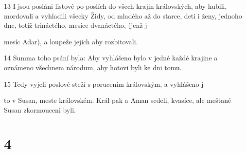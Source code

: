 \par 13 I jsou posláni listové po poslích do všech krajin královských, aby hubili, mordovali a vyhladili všecky Židy, od mladého až do starce, deti i ženy, jednoho dne, totiž trináctého, mesíce dvanáctého, (jenž j\par mesíc Adar), a loupeže jejich aby rozbitovali.
\par 14 Summa toho psání byla: Aby vyhlášeno bylo v jedné každé krajine a oznámeno všechnem národum, aby hotovi byli ke dni tomu.
\par 15 Tedy vyjeli poslové steží s porucením královským, a vyhlášeno j\par to v Susan, meste královském. Král pak a Aman sedeli, kvasíce, ale meštané Susan zkormouceni byli.

\chapter{4}

